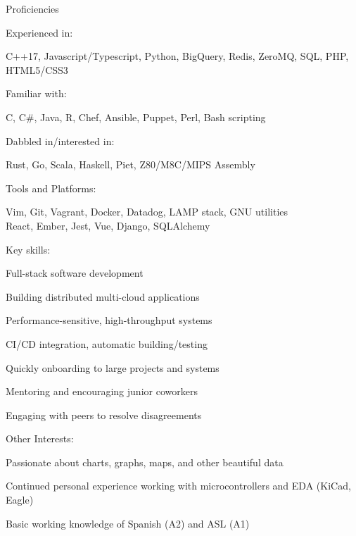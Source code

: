 \documentclass[letterpaper,12pt]{article}
\begin{document}
\begin{paracol}{2}
\vspace{2em}
\begin{rsection}{Proficiencies}
  \begin{rpara}{Experienced in:}%
    \raggedright
    C++17, Javascript/Typescript, Python, BigQuery, Redis, ZeroMQ, SQL, PHP, HTML5/CSS3
  \end{rpara}
  \begin{rpara}{Familiar with:}%
    \raggedright
    C, C\#, Java, R, Chef, Ansible, Puppet, Perl, Bash scripting
  \end{rpara}
  \begin{rpara}{Dabbled in/interested in:}%
    \raggedright
    Rust, Go, Scala, Haskell, Piet, Z80/M8C/MIPS Assembly
  \end{rpara}
  \begin{rpara}{Tools and Platforms:}%
    \raggedright
    Vim, Git, Vagrant, Docker, Datadog, LAMP stack, GNU utilities\\
    React, Ember, Jest, Vue, Django, SQLAlchemy
  \end{rpara}
  \newpage
  \begin{rsubitems}[
    leftmargin=1.5em,
    itemindent=0em,
    labelwidth=1.5em
  ]{Key skills:}
    \item Full-stack software development
    \item Building distributed multi-cloud applications
    \item Performance-sensitive, high-throughput systems
    \item CI/CD integration, automatic building/testing
    \item Quickly onboarding to large projects and systems
    \item Mentoring and encouraging junior coworkers
    \item Engaging with peers to resolve disagreements
  \end{rsubitems}
  \begin{rsubitems}[
    leftmargin=1.5em,
    itemindent=0em,
    labelwidth=1.5em
  ]{Other Interests:}
    \item Passionate about charts, graphs, maps, and other beautiful data\\
    \item Continued personal experience working with microcontrollers and EDA (KiCad, Eagle)
    \item Basic working knowledge of Spanish (A2) and ASL (A1)
  \end{rsubitems}
\end{rsection}
\switchcolumn


\end{paracol}
\end{document}
